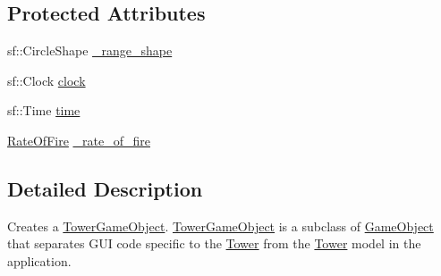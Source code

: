 \subsection*{Protected Attributes}
\begin{DoxyCompactItemize}
\item 
sf\+::\+Circle\+Shape \hyperlink{class_tower_game_object_a3c154fe0b6a056540332b0c40d60304f}{\+\_\+range\+\_\+shape}
\item 
sf\+::\+Clock \hyperlink{class_tower_game_object_a5c5f8162877828c20bf937c90338205c}{clock}
\item 
sf\+::\+Time \hyperlink{class_tower_game_object_ade7e1ea2089b38f90fa3920a80a3619a}{time}
\item 
\hyperlink{class_tower_game_object_a6a687237ad352e41acb35f8b4cf25fa3}{Rate\+Of\+Fire} \hyperlink{class_tower_game_object_a791d99099306673e85ed6b93fd6f7b1b}{\+\_\+rate\+\_\+of\+\_\+fire}
\end{DoxyCompactItemize}


\subsection{Detailed Description}
Creates a \hyperlink{class_tower_game_object}{Tower\+Game\+Object}. \hyperlink{class_tower_game_object}{Tower\+Game\+Object} is a subclass of \hyperlink{class_game_object}{Game\+Object} that separates G\+U\+I code specific to the \hyperlink{class_tower}{Tower} from the \hyperlink{class_tower}{Tower} model in the application. 


